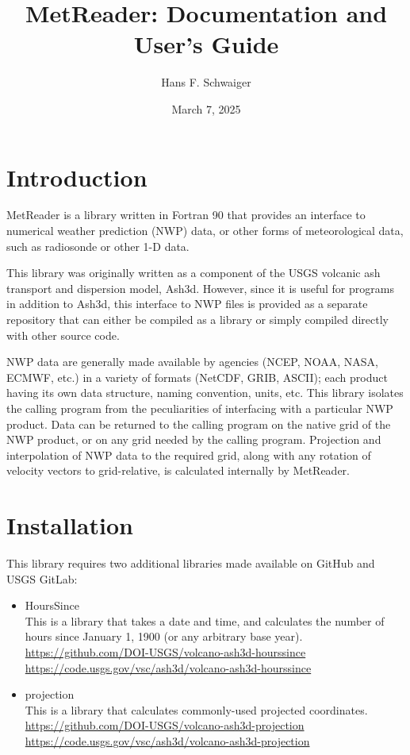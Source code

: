 \documentclass[11pt]{article}   %
\begin{document}
\title{MetReader: Documentation and User's Guide}   %
\author{Hans F. Schwaiger}
\date{March 7, 2025}    %
\maketitle

\section{Introduction}
MetReader is a library written in Fortran 90 that provides an interface to
numerical weather prediction (NWP) data, or other forms of meteorological
data, such as radiosonde or other 1-D data.

This library was originally written as a component of the USGS volcanic ash
transport and dispersion model, Ash3d.  However, since it is useful for
programs in addition to Ash3d, this interface to NWP files is provided
as a separate repository that can either be compiled as a library or simply
compiled directly with other source code.

NWP data are generally made available by agencies (NCEP, NOAA, NASA, ECMWF, etc.)
in a variety of formats (NetCDF, GRIB, ASCII); each product having
its own data structure, naming convention, units, etc.  This library
isolates the calling program from the peculiarities of interfacing with
a particular NWP product.  Data can be returned to the calling program on
the native grid of the NWP product, or on any grid needed by the calling
program.  Projection and interpolation of NWP data to the required grid, along
with any rotation of velocity vectors to grid-relative, is calculated internally by
MetReader.

\section{Installation}
This library requires two additional libraries made available on GitHub and USGS GitLab:
\begin{itemize}
\item HoursSince \\
This is a library that takes a date and time, and calculates the number of hours
since January 1, 1900 (or any arbitrary base year).\\
\url{https://github.com/DOI-USGS/volcano-ash3d-hourssince}\\
\url{https://code.usgs.gov/vsc/ash3d/volcano-ash3d-hourssince}
\item projection \\
This is a library that calculates commonly-used projected coordinates.\\
\url{https://github.com/DOI-USGS/volcano-ash3d-projection}\\
\url{https://code.usgs.gov/vsc/ash3d/volcano-ash3d-projection}
\end{itemize}
\end{document}
